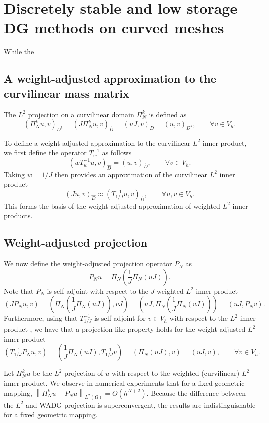 \documentclass[preprint,10pt]{article}
\theoremstyle{definition}
\theoremstyle{lemma}
\theoremstyle{theorem}
\theoremstyle{assumption}
\renewcommand{\hat}{\widehat}
\newcommand{\nor}[1]{\left\| #1 \right\|}
\newcommand{\LRp}[1]{\left( #1 \right)}
\begin{document}
{\section{Discretely stable and low storage DG methods on curved meshes}

While the 

\subsection{A weight-adjusted approximation to the curvilinear mass matrix}

The $L^2$ projection on a curvilinear domain $\Pi_N^k$ is defined as
\[
\LRp{\Pi_N^k u,v}_{D^k} = \LRp{J \Pi_N^k u,v}_{\hat{D}} = \LRp{uJ,v}_{\hat{D}} = \LRp{u,v}_{D^k}, \qquad \forall v\in V_h.
\]


To define a weight-adjusted approximation to the curvilinear $L^2$ inner product, we first define the operator $T_{w}^{-1}$ as follows
\[
\LRp{wT_{w}^{-1} u,v}_{\hat{D}} = \LRp{ u,v}_{\hat{D}}, \qquad \forall v\in V_h.
\]
Taking $w = 1/J$ then provides an approximation of the curvilinear $L^2$ inner product
\[
\LRp{J u,v}_{\hat{D}}\approx \LRp{T_{1/J}^{-1} u,v}_{\hat{D}}, \qquad \forall u,v\in V_h.
\]
This forms the basis of the weight-adjusted approximation of weighted $L^2$ inner products.  

\subsection{Weight-adjusted projection} 
We now define the weight-adjusted projection operator $P_N$ as 
\[
P_N u = \Pi_N\LRp{\frac{1}{J}\Pi_N\LRp{uJ}}.
\]
Note that $P_N$ is self-adjoint with respect to the $J$-weighted $L^2$ inner product
\begin{equation}
\LRp{J P_N u, v} = \LRp{\Pi_N\LRp{\frac{1}{J}\Pi_N\LRp{uJ}}, vJ} = \LRp{uJ, \Pi_N\LRp{\frac{1}{J}\Pi_N\LRp{vJ}}} =  \LRp{uJ, P_N v}.
\label{eq:PNsym}
\end{equation}
Furthermore, using that $T_{1/J}^{-1}$ is self-adjoint for $v \in V_h$ with respect to the $L^2$ inner product \cite{chan2016weight1}, we have that a projection-like property holds for the weight-adjusted $L^2$ inner product
\begin{equation}
\LRp{T_{1/J}^{-1} P_N u,v} = \LRp{ \frac{1}{J}\Pi_N(uJ),T_{1/J}^{-1}v} = \LRp{\Pi_N(u J),v} = \LRp{u J,v}, \qquad \forall v\in V_h.
\label{eq:PNproj}
\end{equation}

Let $\Pi_N^k u$ be the $L^2$ projection of $u$ with respect to the weighted (curvilinear) $L^2$ inner product.  We observe in numerical experiments that for a fixed geometric mapping, $\nor{\Pi_N^k u - P_N u}_{L^2\LRp{\Omega}} = O(h^{N+2})$.  Because the difference between the $L^2$ and WADG projection is superconvergent, the results are indistinguishable for a fixed geometric mapping.  

}
\end{document}
